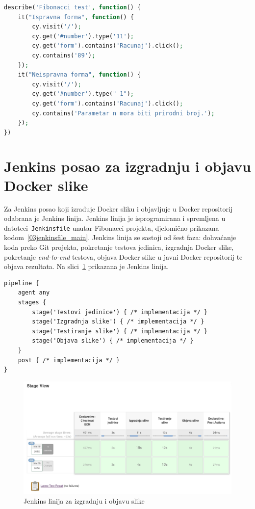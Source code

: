 \begin{lstlisting}[language=php,float=h]
describe('Fibonacci test', function() {
    it("Ispravna forma", function() {
        cy.visit('/');
        cy.get('#number').type('11');
        cy.get('form').contains('Racunaj').click();
        cy.contains('89');
    });
    it("Neispravna forma", function() {
        cy.visit('/');
        cy.get('#number').type("-1");
        cy.get('form').contains('Racunaj').click();
        cy.contains('Parametar n mora biti prirodni broj.');
    });
})
\end{lstlisting}

\section{Jenkins posao za izgradnju i objavu Docker slike}
Za Jenkins posao koji izrađuje Docker sliku i objavljuje u Docker repositorij odabrana je Jenkins
linija. Jenkins linija je isprogramirana i spremljena u datoteci~\texttt{Jenkinsfile} unutar
Fibonacci projekta, djelomično prikazana kodom~\ref{03jenkinsfile_main}. Jenkins linija se sastoji
od šest faza: dohvaćanje koda preko Git projekta, pokretanje testova jedinica, izgradnja Docker
slike, pokretanje \textit{end-to-end} testova, objava Docker slike u javni Docker repositorij te
objava rezultata. Na slici~\ref{fig:03jenkins_pipeline} prikazana je Jenkins linija.

\begin{lstlisting}[float=h]
pipeline {
    agent any
    stages {
        stage('Testovi jedinice') { /* implementacija */ }
        stage('Izgradnja slike') { /* implementacija */ }
        stage('Testiranje slike') { /* implementacija */ }
        stage('Objava slike') { /* implementacija */ }
    }
    post { /* implementacija */ }
}
\end{lstlisting}

\begin{figure}[h]
    \centering
    \includegraphics[width=\textwidth]{img/03/jenkins_pipeline.png}
    \caption{Jenkins linija za izgradnju i objavu slike}%
    \label{fig:03jenkins_pipeline}
\end{figure}

